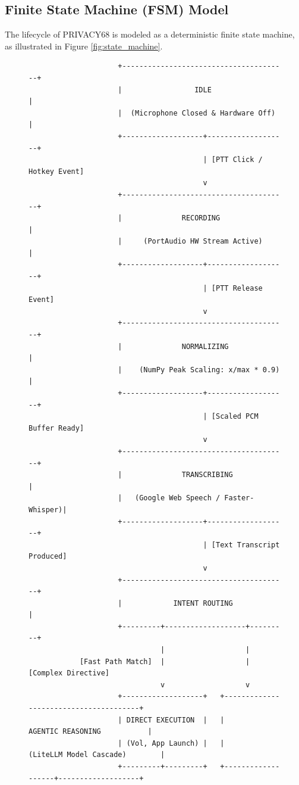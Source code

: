 \subsection{Finite State Machine (FSM) Model}
The lifecycle of PRIVACY68 is modeled as a deterministic finite state machine, as illustrated in Figure \ref{fig:state_machine}.

\begin{figure}[htbp]
\centering
{\scriptsize
\begin{verbatim}
                     +---------------------------------------+
                     |                 IDLE                  |
                     |  (Microphone Closed & Hardware Off)   |
                     +-------------------+-------------------+
                                         | [PTT Click / Hotkey Event]
                                         v
                     +---------------------------------------+
                     |              RECORDING                |
                     |     (PortAudio HW Stream Active)      |
                     +-------------------+-------------------+
                                         | [PTT Release Event]
                                         v
                     +---------------------------------------+
                     |              NORMALIZING              |
                     |    (NumPy Peak Scaling: x/max * 0.9)  |
                     +-------------------+-------------------+
                                         | [Scaled PCM Buffer Ready]
                                         v
                     +---------------------------------------+
                     |              TRANSCRIBING             |
                     |   (Google Web Speech / Faster-Whisper)|
                     +-------------------+-------------------+
                                         | [Text Transcript Produced]
                                         v
                     +---------------------------------------+
                     |            INTENT ROUTING             |
                     +---------+-------------------+---------+
                               |                   |
            [Fast Path Match]  |                   | [Complex Directive]
                               v                   v
                     +-------------------+   +---------------------------------------+
                     | DIRECT EXECUTION  |   |           AGENTIC REASONING           |
                     | (Vol, App Launch) |   |        (LiteLLM Model Cascade)        |
                     +---------+---------+   +-------------------+-------------------+

\end{verbatim}}
\end{figure}

